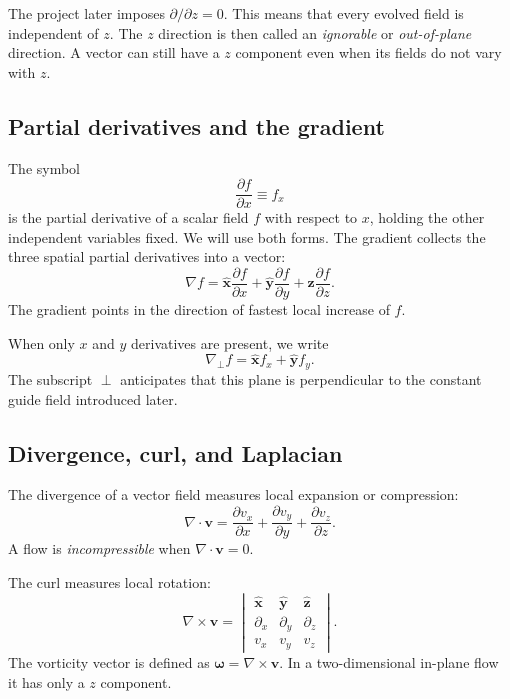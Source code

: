 \documentclass[11pt]{article}
\newcommand{\vect}[1]{\bm{#1}}
\begin{document}
The project later imposes $\partial/\partial z=0$. This means that every evolved field is independent of $z$. The $z$ direction is then called an \emph{ignorable} or \emph{out-of-plane} direction. A vector can still have a $z$ component even when its fields do not vary with $z$.

\subsection{Partial derivatives and the gradient}

The symbol
\begin{equation}
\frac{\partial f}{\partial x}\equiv f_x
\end{equation}
is the partial derivative of a scalar field $f$ with respect to $x$, holding the other independent variables fixed. We will use both forms. The gradient collects the three spatial partial derivatives into a vector:
\begin{equation}
\nabla f
=\widehat{\vect{x}}\frac{\partial f}{\partial x}
+\widehat{\vect{y}}\frac{\partial f}{\partial y}
+\widehat{\vect{z}}\frac{\partial f}{\partial z}.
\end{equation}
The gradient points in the direction of fastest local increase of $f$.

When only $x$ and $y$ derivatives are present, we write
\begin{equation}
\nabla_\perp f
=\widehat{\vect{x}}f_x+\widehat{\vect{y}}f_y.
\end{equation}
The subscript $\perp$ anticipates that this plane is perpendicular to the constant guide field introduced later.

\subsection{Divergence, curl, and Laplacian}

The divergence of a vector field measures local expansion or compression:
\begin{equation}
\nabla\cdot\vect{v}
=\frac{\partial v_x}{\partial x}
+\frac{\partial v_y}{\partial y}
+\frac{\partial v_z}{\partial z}.
\end{equation}
A flow is \emph{incompressible} when $\nabla\cdot\vect{v}=0$.

The curl measures local rotation:
\begin{equation}
\nabla\times\vect{v}
=
\begin{vmatrix}
\widehat{\vect{x}}&\widehat{\vect{y}}&\widehat{\vect{z}}\\
\partial_x&\partial_y&\partial_z\\
v_x&v_y&v_z
\end{vmatrix}.
\end{equation}
The vorticity vector is defined as $\boldsymbol{\omega}=\nabla\times\vect{v}$. In a two-dimensional in-plane flow it has only a $z$ component.
\end{document}
